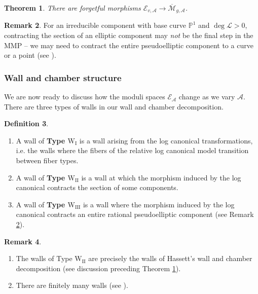 \documentclass[11pt]{amsart}
\newtheorem{theorem}{Theorem}[section]
\theoremstyle{definition}
\newtheorem{definition}[theorem]{Definition}
\newtheorem{remark}[theorem]{Remark}
\theoremstyle{remark}
\newcounter{step}
\newcommand{\bP}{{\mathbb P}}
\newcommand{\calM}{\mathcal M}
\newcommand{\calA}{\mathcal A}
\newcommand{\calE}{\mathcal E}
\begin{document}
	\begin{theorem}\cite[Theorem 1.4]{master}\label{thm:forgetful} There are forgetful morphisms $\calE_{v, \calA} \to \overline{\calM}_{g, \calA}$. \end{theorem}
	
	
	\begin{remark}\label{rmk:contraction} For an irreducible component with base curve $\bP^1$ and $\deg \mathscr{L} > 0$,  contracting the section of an elliptic component may \emph{not} be the final step in the MMP -- we may need to contract the entire pseudoelliptic component to a curve or a point (see \cite[Proposition 7.4]{calculations}). \end{remark}
	
	\subsubsection{Wall and chamber structure} We are now ready to discuss how the moduli spaces $\calE_\calA$ change as we vary $\calA$. There are three types of walls in our wall and chamber decomposition.
	
	\begin{definition}\label{def:walltypes} \leavevmode \begin{enumerate}
			\item[(I)] A wall of \textbf{Type $\mathrm{W}_{\mathrm{I}}$} is a wall arising from the log canonical transformations, i.e. the walls where the fibers of the relative log canonical model
			transition  between fiber types.
			\item[(II)] A wall of \textbf{Type $\mathrm{W}_{\mathrm{II}}$} is a wall at which the morphism induced by the log canonical contracts the section of some components.
			\item[(III)] A wall of \textbf{Type $\mathrm{W}_{\mathrm{III}}$} is a wall where the morphism induced by the log canonical contracts an entire rational pseudoelliptic component (see Remark \ref{rmk:contraction}). \end{enumerate} \end{definition}
	
	
	\begin{remark}\label{rmk:hassettwall2}\leavevmode
		\begin{enumerate}
			\item The walls of Type $\mathrm{W}_{\mathrm{II}}$ are precisely the walls of Hassett's wall and chamber decomposition \cite{has} (see discussion preceding Theorem \ref{thm:forgetful}). 
			\item There are finitely many walls (see \cite[Theorem 6.3]{master}).
		\end{enumerate}
	\end{remark}
	
\end{document}
